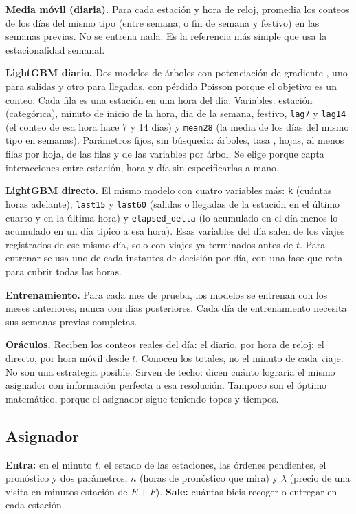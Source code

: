\documentclass[conference,letterpaper,10pt]{IEEEtran}
\newcommand{\EF}{E+F}
\begin{document}
\textbf{Media móvil (diaria).} Para cada estación y hora de reloj, promedia los conteos de los días del mismo tipo (entre semana, o fin de semana y festivo) en las \rsemanasHist{} semanas previas. No se entrena nada. Es la referencia más simple que usa la estacionalidad semanal.

\textbf{LightGBM diario.} Dos modelos de árboles con potenciación de gradiente \cite{ke2017lightgbm}, uno para salidas y otro para llegadas, con pérdida Poisson porque el objetivo es un conteo. Cada fila es una estación en una hora del día. Variables: estación (categórica), minuto de inicio de la hora, día de la semana, festivo, \texttt{lag7} y \texttt{lag14} (el conteo de esa hora hace 7 y 14 días) y \texttt{mean28} (la media de los días del mismo tipo en \rsemanasHist{} semanas). Parámetros fijos, sin búsqueda: \rlgbArboles{} árboles, tasa \rlgbTasa, \rlgbHojas{} hojas, al menos \rlgbMinHoja{} filas por hoja, \rlgbFilas{} de las filas y \rlgbCols{} de las variables por árbol. Se elige porque capta interacciones entre estación, hora y día sin especificarlas a mano.

\textbf{LightGBM directo.} El mismo modelo con cuatro variables más: \texttt{k} (cuántas horas adelante), \texttt{last15} y \texttt{last60} (salidas o llegadas de la estación en el último cuarto y en la última hora) y \texttt{elapsed\_delta} (lo acumulado en el día menos lo acumulado en un día típico a esa hora). Esas variables del día salen de los viajes registrados de ese mismo día, solo con viajes ya terminados antes de $t$. Para entrenar se usa uno de cada \rcadaTicks{} instantes de decisión por día, con una fase que rota para cubrir todas las horas.

\textbf{Entrenamiento.} Para cada mes de prueba, los modelos se entrenan con los \rtrainMeses{} meses anteriores, nunca con días posteriores. Cada día de entrenamiento necesita sus \rsemanasHist{} semanas previas completas.

\textbf{Oráculos.} Reciben los conteos reales del día: el diario, por hora de reloj; el directo, por hora móvil desde $t$. Conocen los totales, no el minuto de cada viaje. No son una estrategia posible. Sirven de techo: dicen cuánto lograría el mismo asignador con información perfecta a esa resolución. Tampoco son el óptimo matemático, porque el asignador sigue teniendo topes y tiempos.

\subsection{Asignador}
\textbf{Entra:} en el minuto $t$, el estado de las estaciones, las órdenes pendientes, el pronóstico y dos parámetros, $n$ (horas de pronóstico que mira) y $\lambda$ (precio de una visita en minutos-estación de $\EF$). \textbf{Sale:} cuántas bicis recoger o entregar en cada estación.
\end{document}
